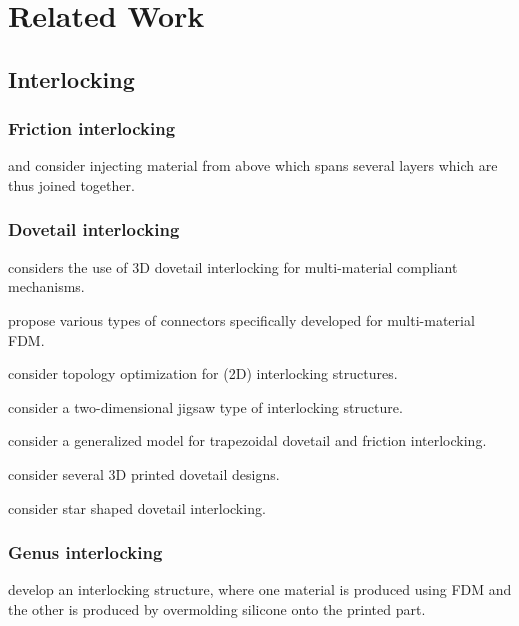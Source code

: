 \section{Related Work}

\subsection{Interlocking}

\subsubsection{Friction interlocking}

\cite{Duty2019} and \cite{Kazmer2020} consider injecting material from above which spans several layers which are thus joined together.


\subsubsection{Dovetail interlocking}

\cite{gouker2006manufacturing} considers the use of 3D dovetail interlocking for multi-material compliant mechanisms.

\cite{debora2020} propose various types of connectors specifically developed for multi-material FDM.

\cite{aharoni2021} consider topology optimization for (2D) interlocking structures.

\cite{malik2017} consider a two-dimensional jigsaw type of interlocking structure.

\cite{Li2013} consider a generalized model for trapezoidal dovetail and friction interlocking.

\cite{Ribeiro2019} consider several 3D printed dovetail designs.

\cite{Wang2021} consider star shaped dovetail interlocking.


\subsubsection{Genus interlocking}

\cite{Rossing2020} develop an interlocking structure, where one material is produced using FDM and the other is produced by overmolding silicone onto the printed part.


